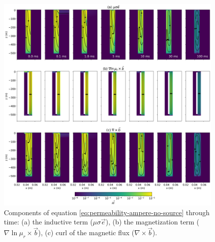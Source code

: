 \begin{figure}
    \begin{center}
    \includegraphics[width=\textwidth]{figures/magnetization-currents-casing.png}
    \end{center}
\caption{
    Components of equation \ref{eq:permeability-ampere-no-source} through time: (a) the inductive term ($\mu\sigma\vec{e}$), (b) the magnetization term ($\nabla \ln \mu_r \times \vec{b}$), (c) curl of the magnetic flux ($\nabla \times \vec{b}$).
}
\label{fig:magnetization-currents-casing}
\end{figure}



